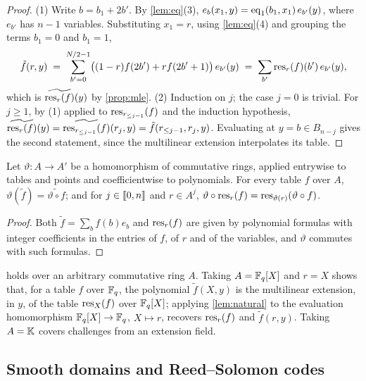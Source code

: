 \begin{proof}
(1) Write $b = b_1 + 2b'$. By \cref{lem:eq}(3), $e_b(x_1, y) = \mathrm{eq}_1(b_1, x_1)\, e_{b'}(y)$, where $e_{b'}$ has $n-1$ variables.
Substituting $x_1 = r$, using \cref{lem:eq}(4) and grouping the terms $b_1 = 0$ and $b_1 = 1$,
\[
  \tilde f(r, y) \;=\; \sum_{b'=0}^{N/2-1} \bigl( (1-r) f(2b') + r f(2b'+1) \bigr)\, e_{b'}(y) \;=\; \sum_{b'} \mathrm{res}_r(f)(b')\, e_{b'}(y),
\]
which is $\widetilde{\mathrm{res}_r(f)}(y)$ by \cref{prop:mle}.
(2) Induction on $j$; the case $j = 0$ is trivial. For $j \ge 1$, by (1) applied to $\mathrm{res}_{r_{\le j-1}}(f)$ and the induction hypothesis,
$\widetilde{\mathrm{res}_{r}(f)}(y) = \widetilde{\mathrm{res}_{r_{\le j-1}}(f)}(r_j, y) = \tilde f(r_{\le j-1}, r_j, y)$.
Evaluating at $y = b \in B_{n-j}$ gives the second statement, since the multilinear extension interpolates its table.
\end{proof}

\begin{lemma}[Naturality]\label{lem:natural}
Let $\vartheta : A \to A'$ be a homomorphism of commutative rings, applied entrywise to tables and points and coefficientwise to polynomials.
For every table $f$ over $A$, $\vartheta(\tilde f) = \widetilde{\vartheta \circ f}$; and for $j \in \llbracket 0, n \rrbracket$ and $r \in A^j$, $\vartheta \circ \mathrm{res}_r(f) = \mathrm{res}_{\vartheta(r)}(\vartheta \circ f)$.
\end{lemma}

\begin{proof}
Both $\tilde f = \sum_b f(b) e_b$ and $\mathrm{res}_r(f)$ are given by polynomial formulas with integer coefficients in the entries of $f$, of $r$ and of the variables, and $\vartheta$ commutes with such formulas.
\end{proof}

\begin{remark}\label{rem:formal}
 holds over an arbitrary commutative ring $A$.
Taking $A = \mathbb{F}_q[X]$ and $r = X$ shows that, for a table $f$ over $\mathbb{F}_q$, the polynomial $\tilde f(X, y)$ is the multilinear extension, in $y$, of the table $\mathrm{res}_X(f)$ over $\mathbb{F}_q[X]$; applying \cref{lem:natural} to the evaluation homomorphism $\mathbb{F}_q[X] \to \mathbb{F}_q$, $X \mapsto r$, recovers $\mathrm{res}_r(f)$ and $\tilde f(r, y)$.
Taking $A = \mathbb{K}$ covers challenges from an extension field.
\end{remark}

\subsection{Smooth domains and Reed--Solomon codes}\label{sec:prelim:rs}

